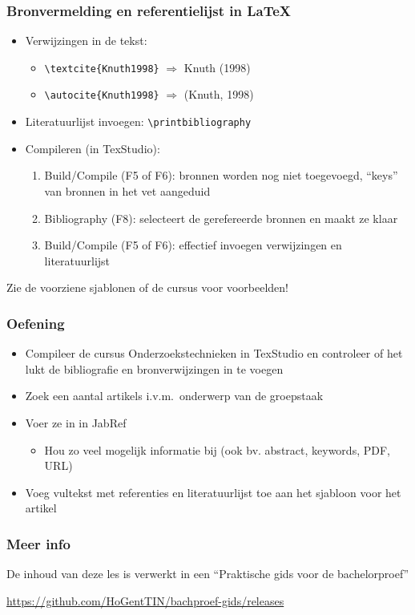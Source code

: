 \documentclass[aspectratio=169]{beamer}
\begin{document}
\begin{frame}[fragile]
  \frametitle{Bronvermelding en referentielijst in {\LaTeX}}
  
  \begin{itemize}
  \item Verwijzingen in de tekst:
  
  \begin{itemize}
    \item \verb|\textcite{Knuth1998}| $\Rightarrow$ Knuth (1998)
    \item \verb|\autocite{Knuth1998}| $\Rightarrow$ (Knuth, 1998)
  \end{itemize}
  
  \item Literatuurlijst invoegen: \verb|\printbibliography|
  
  \item Compileren (in TexStudio):
  
  \begin{enumerate}
    \item Build/Compile (F5 of F6): bronnen worden nog niet toegevoegd, ``keys'' van bronnen in het vet aangeduid
    \item Bibliography (F8): selecteert de gerefereerde bronnen en maakt ze klaar
    \item Build/Compile (F5 of F6): effectief invoegen verwijzingen en literatuurlijst
  \end{enumerate}
  \end{itemize}
  
  Zie de voorziene sjablonen of de cursus voor voorbeelden!
\end{frame}

\begin{frame}
  \frametitle{Oefening}

  \begin{itemize}
    \item Compileer de cursus Onderzoekstechnieken in TexStudio en controleer of het lukt de bibliografie en bronverwijzingen in te voegen
    \item Zoek een aantal artikels i.v.m.~onderwerp van de groepstaak
    \item Voer ze in in JabRef
      \begin{itemize}
        \item Hou zo veel mogelijk informatie bij (ook bv. abstract, keywords, PDF, URL)
      \end{itemize}
    \item Voeg vultekst met referenties en literatuurlijst toe aan het sjabloon voor het artikel
  \end{itemize}
\end{frame}

\begin{frame}
  \frametitle{Meer info}
  
  De inhoud van deze les is verwerkt in een ``Praktische gids voor de bachelorproef''
  
  \vspace{12pt}
  
  \url{https://github.com/HoGentTIN/bachproef-gids/releases}
  
\end{frame}
\end{document}
